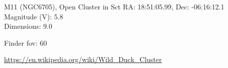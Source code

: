 \begin{block}{M11 (NGC6705), Open Cluster in Sct}
    RA: 18:51:05.99, Dec: -06:16:12.1 \\ 
    Magnitude (V): 5.8 \\ 
    Dimensions: 9.0 

    Finder fov: 60 

    \url{https://en.wikipedia.org/wiki/Wild_Duck_Cluster} 
\end{block}